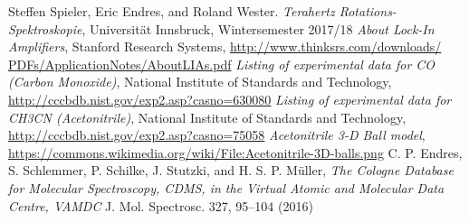 \documentclass[a4paper,10pt]{scrartcl}
\begin{document}
\begin{thebibliography}{9}
{
Steffen Spieler, Eric Endres, and Roland Wester. \textit{Terahertz Rotations-Spektroskopie}, Universität Innsbruck, Wintersemester 2017/18
}
{
\textit{About Lock-In Amplifiers}, Stanford Research Systems, \url{http://www.thinksrs.com/downloads/
PDFs/ApplicationNotes/AboutLIAs.pdf}
}
{
\textit{Listing of experimental data for CO (Carbon Monoxide)}, National Institute of Standards and Technology, \url{http://cccbdb.nist.gov/exp2.asp?casno=630080}
}
{
\textit{Listing of experimental data for CH3CN (Acetonitrile)}, National Institute of Standards and Technology, \url{http://cccbdb.nist.gov/exp2.asp?casno=75058}
}
{
\textit{Acetonitrile 3-D Ball model}, \url{https://commons.wikimedia.org/wiki/File:Acetonitrile-3D-balls.png}
}
{
C. P. Endres, S. Schlemmer, P. Schilke, J. Stutzki, and H. S. P. Müller,
\textit{The Cologne Database for Molecular Spectroscopy, CDMS, in the Virtual Atomic and Molecular Data Centre, VAMDC}
J. Mol. Spectrosc. 327, 95–104 (2016)
}
\end{thebibliography}
\end{document}
